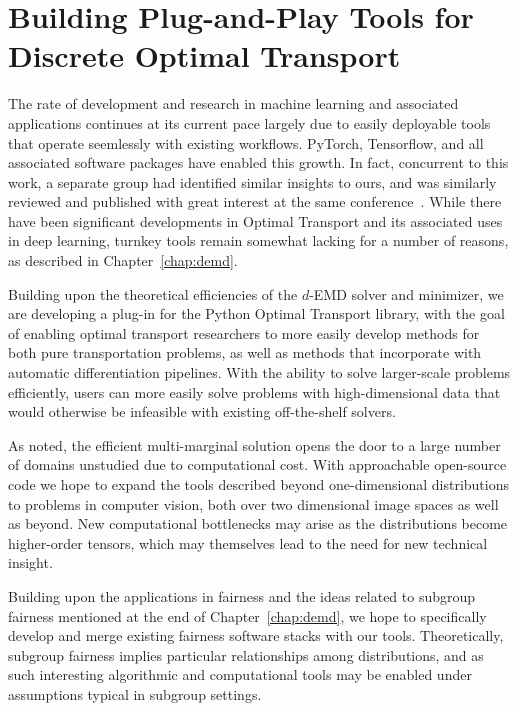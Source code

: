 \section{Building Plug-and-Play Tools for Discrete Optimal Transport}

The rate of development and research in machine learning and associated applications
continues at its current pace
largely due to 
easily deployable tools that
operate seemlessly with existing workflows.
PyTorch, Tensorflow, and all associated software
packages have enabled this growth.
In fact,
concurrent to this work,
a separate group had identified 
similar insights to ours,
and was similarly reviewed and published
with great interest at the same conference~\citep{just2023lava}.
While there have been significant 
developments in Optimal Transport
and its associated 
uses in deep learning,
turnkey tools remain somewhat lacking
for a number of reasons,
as described in Chapter~\ref{chap:demd}.

Building upon the theoretical
efficiencies of the $d$-EMD solver
and minimizer,
we are developing
a plug-in for the Python Optimal Transport library,
with the goal of enabling
optimal transport researchers to 
more easily develop methods
for both pure transportation problems,
as well as methods that incorporate
with automatic differentiation pipelines.
With the ability to solve larger-scale 
problems efficiently,
users can more easily solve 
problems with high-dimensional data
that would otherwise be infeasible
with existing off-the-shelf solvers.

As noted,
the efficient multi-marginal solution
opens the door to a large number 
of domains unstudied due to computational cost.
With approachable open-source code
we hope to expand the tools described
beyond one-dimensional distributions
to problems in computer vision,
both over two dimensional image spaces
as well as beyond.
New computational bottlenecks may arise
as the distributions become
higher-order tensors, which 
may themselves lead to 
the need for new technical
insight.

Building upon the applications in fairness
and the ideas related to subgroup fairness
mentioned at the end of Chapter~\ref{chap:demd},
we hope to specifically
develop and merge existing fairness
software stacks with our tools.
Theoretically, subgroup fairness implies
particular relationships among distributions,
and as such interesting algorithmic
and computational tools may be enabled
under assumptions typical in subgroup settings.

